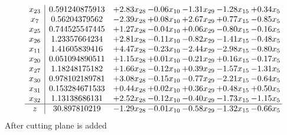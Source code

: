 \documentclass[8pt]{article}
\begin{document}
\[\begin{array}{c| c c@{\hskip 2pt} c@{\hskip 2pt} c@{\hskip 2pt} c@{\hskip 2pt} c@{\hskip 2pt} }
 x_{23}   &  0.591240875913 & +  2.83 x_{28} & -0.06 x_{10} & -1.31 x_{29} & -1.28 x_{15} & +  0.34 x_{5}\\
 x_{7}   &  0.56204379562 & -2.39 x_{28} & +  0.08 x_{10} & +  2.67 x_{29} & +  0.77 x_{15} & -0.85 x_{5}\\
 x_{25}   &  0.744525547445 & +  1.27 x_{28} & -0.04 x_{10} & +  0.06 x_{29} & -0.80 x_{15} & -0.16 x_{5}\\
 x_{26}   &  1.23357664234 & +  2.81 x_{28} & -0.11 x_{10} & -0.82 x_{29} & -1.41 x_{15} & -0.48 x_{5}\\
 x_{11}   &  1.41605839416 & +  4.47 x_{28} & -0.23 x_{10} & -2.44 x_{29} & -2.98 x_{15} & -0.80 x_{5}\\
 x_{20}   &  0.051094890511 & +  1.15 x_{28} & +  0.01 x_{10} & -0.21 x_{29} & +  0.16 x_{15} & -0.17 x_{5}\\
 x_{27}   &  1.18248175182 & +  1.66 x_{28} & -0.12 x_{10} & +  0.39 x_{29} & -1.57 x_{15} & -1.31 x_{5}\\
 x_{30}   &  0.978102189781 & +  3.08 x_{28} & -0.15 x_{10} & -0.77 x_{29} & -2.21 x_{15} & -0.64 x_{5}\\
 x_{31}   &  0.153284671533 & +  0.44 x_{28} & +  0.02 x_{10} & +  0.36 x_{29} & +  0.48 x_{15} & +  0.50 x_{5}\\
 x_{32}   &  1.13138686131 & +  2.52 x_{28} & -0.12 x_{10} & -0.40 x_{29} & -1.73 x_{15} & -1.15 x_{5}\\
\hline
z    &  30.897810219 & -1.29 x_{28} & -0.01 x_{10} & -0.58 x_{29} & -1.32 x_{15} & -0.66 x_{5}\\
\end{array}\]
 After cutting plane is added 
\end{document}
